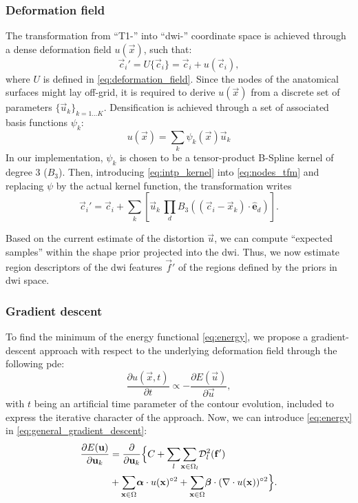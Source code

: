 \subsubsection{Deformation field}
\label{sec:deformation_field}
The transformation from ``T1-'' into ``\gls{dwi}-'' coordinate space is
achieved through a dense deformation field $u(\vec{x})$, such that:
\begin{equation}
\vec{c}_i' = U\{\vec{c}_i\} = \vec{c}_i + u(\vec{c}_i),
\label{eq:nodes_tfm}
\end{equation}
where $U$ is defined in \eqref{eq:deformation_field}. Since the nodes of the anatomical
surfaces might lay off-grid, it is required to derive $u(\vec{x})$ from a discrete
set of parameters $\{\vec{u}_k\}_{k=1 \ldots K}$. Densification is achieved through
a set of associated basis functions $\psi_k$:
%
\begin{equation}
u(\vec{x}) = \sum_k \psi_k(\vec{x}) \vec{u}_k
\label{eq:intp_kernel}
\end{equation}
%
In our implementation, $\psi_k$ is chosen to be a tensor-product B-Spline kernel
of degree 3 ($B_3$).
Then, introducing \eqref{eq:intp_kernel} into \eqref{eq:nodes_tfm} and replacing
$\psi$ by the actual kernel function, the transformation writes
%
\begin{equation}
\vec{c}_i' = \vec{c}_i + \sum_k \left[ \vec{u}_k \, \underset{d}{\prod} B_3( (\vec{c}_i - \vec{x}_k) \cdot \hat{\mathbf{e}}_d ) \right].
\label{eq:transformation}
\end{equation}

Based on the current estimate of the distortion $\vec{u}$, we can compute
``expected samples'' within the shape prior projected into the \gls{dwi}.
Thus, we now estimate region descriptors of the \gls{dwi} features
$\vec{f}'$ of the regions defined by the priors in \gls{dwi} space.

\subsubsection{Gradient descent}
To find the minimum of the energy functional \eqref{eq:energy},
we propose a gradient-descent approach with respect to the underlying
deformation field through the following \gls*{pde}:
\begin{equation}
\frac{\partial u(\vec{x},t)}{\partial t} \propto - \frac{\partial E(\vec{u})}{\partial \vec{u}},
\label{eq:general_gradient_descent}
\end{equation}
with $t$ being an artificial time parameter of the contour
evolution, included to express the iterative character of the approach.
Now, we can introduce \eqref{eq:energy} in
\eqref{eq:general_gradient_descent}:
\begin{align}
\frac{\partial E(\vec{u})}{\partial \vec{u}_k} &=
\frac{ \partial }{\partial \vec{u}_k} \Big\{
C + \underset{l}{\sum}
\underset{\vec{x} \in \Omega_l}{\sum} \mdist{f'}{l} \notag\\
&+ \underset{\vec{x} \in \Omega}{\sum} \boldsymbol{\alpha} \cdot u(\vec{x})^{\circ2}
+ \underset{\vec{x} \in \Omega}{\sum} \boldsymbol{\beta} \cdot (\nabla \cdot u(\vec{x}))^{\circ2}
\Big\}.
\label{eq:gradient_descent}
\end{align}


